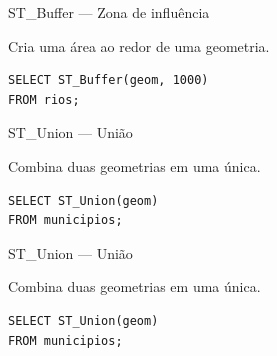 \documentclass{beamer}
\begin{document}
\begin{frame}[fragile]{ST\_Buffer — Zona de influência}
    
    Cria uma área ao redor de uma geometria.
    
    \begin{verbatim}
SELECT ST_Buffer(geom, 1000)
FROM rios;
    \end{verbatim}
    
    \begin{center}
    \end{center}
    
\end{frame}

\begin{frame}[fragile]{ST\_Union — União}
    
    Combina duas geometrias em uma única.
    
    \begin{verbatim}
SELECT ST_Union(geom)
FROM municipios;
    \end{verbatim}
    
    \begin{center}
    \end{center}
    
\end{frame}

\begin{frame}[fragile]{ST\_Union — União}
    
    Combina duas geometrias em uma única.
    
    \begin{verbatim}
SELECT ST_Union(geom)
FROM municipios;
    \end{verbatim}
    
    \begin{center}
    \end{center}
    
\end{frame}
\end{document}
